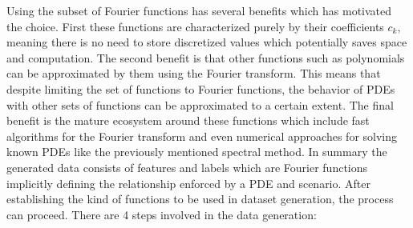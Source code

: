 Using the subset of Fourier functions has several benefits which has motivated the choice. First these functions are characterized purely by their coefficients \(c_k\), meaning there is no need to store discretized values which potentially saves space and computation. The second benefit is that other functions such as polynomials can be approximated by them using the Fourier transform. This means that despite limiting the set of functions to Fourier functions, the behavior of PDEs with other sets of functions can be approximated to a certain extent. The final benefit is the mature ecosystem around these functions which include fast algorithms for the Fourier transform and even numerical approaches for solving known PDEs like the previously mentioned spectral method. In summary the generated data consists of features and labels which are Fourier functions implicitly defining the relationship enforced by a PDE and scenario. After establishing the kind of functions to be used in dataset generation, the process can proceed. There are 4 steps involved in the data generation:%
